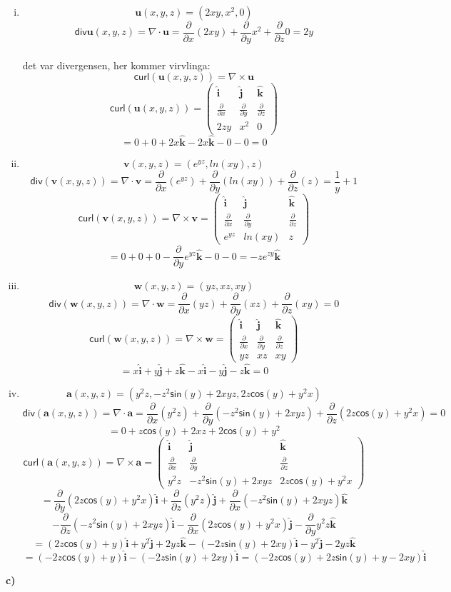 \documentclass[11pt,a4paper, leqno]{report}
\newcommand{\ihat}{\boldsymbol{\hat{\textbf{i}}}}
\newcommand{\jhat}{\boldsymbol{\hat{\textbf{j}}}}
\newcommand{\khat}{\boldsymbol{\hat{\textbf{k}}}}
\newcommand{\partd}[1]{\frac {\partial} {\partial #1}}
\begin{document}
\begin{enumerate}[(i)]
	\item
			$$\mathbf{u}(x,y,z)=(2xy, x^2, 0)$$
			$$\mathsf{div}\mathbf{u}(x,y,z)=\nabla \cdot \mathbf{u}=\partd x (2xy) +\partd y x^2+\partd z  0 =2y$$\\
det var divergensen, her kommer virvlinga:
		$$\mathsf{curl}(\mathbf{u}(x,y,z))=\nabla \times \mathbf{u}$$
		$$\mathsf{curl}(\mathbf{u}(x,y,z))= 
		\left( \begin{array}{ccc}
			\ihat &  \jhat &  \khat \\
			\partd x & \partd y & \partd z \\
			2zy & x^2 & 0 
		\end{array} \right)$$
			$$=0+0+2x\khat-2x\khat-0-0=0$$
	\item 
		$$\mathbf{v}(x,y,z)=(e^{yz}, ln(xy),z)$$
		$$\mathsf{div}(\mathbf{v}(x,y,z))=\nabla\cdot\mathbf{v}=\partd x(e^{yz}) +\partd y (ln(xy))+\partd z (z) = \frac{1}{y} +1$$
		$$\mathsf{curl}(\mathbf{v}(x,y,z))= \nabla \times \mathbf{v} =
		\left( \begin{array}{ccc}
			\ihat &  \jhat &  \khat \\
			\partd x & \partd y & \partd z \\
			e^{yz} & ln(xy) & z 
		\end{array} \right)$$
			$$=0+0+0-\partd y e^{yz} \khat-0-0=-ze^{zy}\khat$$
	\item
		$$ \mathbf{w}(x,y,z)=(yz, xz, xy)$$
		$$\mathsf{div}(\mathbf{w}(x,y,z))=\nabla\cdot\mathbf{w}=\partd x (yz) +\partd y (xz)+\partd z (xy) =0$$
		$$\mathsf{curl}(\mathbf{w}(x,y,z))= \nabla \times \mathbf{w} =
		\left( \begin{array}{ccc}
			\ihat &  \jhat &  \khat \\
			\partd x & \partd y & \partd z \\
			yz & xz & xy 
		\end{array} \right)$$
			$$=x\ihat+y \jhat+ z \khat -x \ihat - y \jhat - z\khat=0$$
	\item
		$$\mathbf{a}(x,y,z)=(y^2z,-z^2 \mathsf{sin}(y) + 2xyz, 2z\mathsf{cos}(y)+y^2x)$$
		$$\mathsf{div}(\mathbf{a}(x,y,z))=\nabla\cdot\mathbf{a}=\partd x (y^2z) +\partd y (-z^2\mathsf{sin}(y) + 2xyz)+\partd z (2z\mathsf{cos}(y)+y^2x) =0$$
		$$=0+z\mathsf{cos}(y)+2xz+2\mathsf{cos}(y)+y^2$$
		$$\mathsf{curl}(\mathbf{a}(x,y,z))= \nabla \times \mathbf{a} =
		\left( \begin{array}{ccc}
			\ihat &  \jhat &  \khat \\
			\partd x & \partd y & \partd z \\
			y^2z & -z^2 \mathsf{sin}(y) + 2xyz & 2z\mathsf{cos}(y)+y^2x 
		\end{array} \right)$$
		$$=\partd y (2z\mathsf{cos}(y)+y^2x) \ihat+  \partd z (y^2z) \jhat+ \partd x (-z^2 \mathsf{sin}(y) + 2xyz) \khat$$
 		$$- \partd z (-z^2 \mathsf{sin}(y) + 2xyz)  \ihat - \partd x (2z\mathsf{cos}(y)+y^2x) \jhat - \partd y y^2z \khat$$
		$$=(2z\mathsf{cos}(y)+y)\ihat+ y^2 \jhat + 2yz \khat - (-2z \mathsf{sin}(y)+ 2xy)\ihat  -y^2 \jhat-2yz \khat$$
		$$=(-2z\mathsf{cos}(y)+y)\ihat- (-2z \mathsf{sin}(y)+ 2xy)\ihat=(-2z\mathsf{cos}(y)+2z \mathsf{sin}(y)+y-2xy)\ihat$$
\end{enumerate}
\newpage
\textbf{c)}\\
\end{document}
